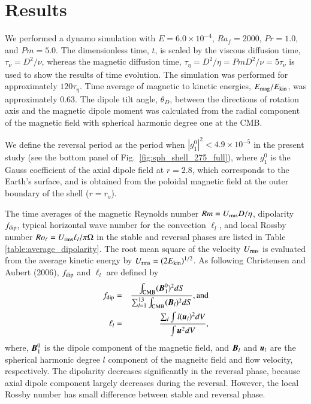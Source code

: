 \section{Results}
\label{section:results}

We performed a dynamo simulation with $E = 6.0 \times 10^{-4}$, $Ra_f = 2000$, $Pr = 1.0$, and $Pm = 5.0$. 
The dimensionless time, $t$, is scaled by the viscous diffusion time, $\tau_\nu = D^2 / \nu$, whereas the magnetic diffusion time, $\tau_\eta = D^2 / \eta = Pm D^2 / \nu = 5 \tau_\nu$ is used to show the results of time evolution.
The simulation was performed for approximately $120 \tau_\eta$. %
Time average of magnetic to kinetic energies, $E_{\rm mag} / E_{\rm kin}$, was approximately 0.63. 
The dipole tilt angle, $\theta_D$, between the directions of rotation axis and the magnetic dipole moment was calculated from the radial component of the magnetic field with spherical harmonic degree one  at the CMB.




We define the reversal period as the period when $\left| g_{1}^{0} \right|^2 < 4.9 \times 10^{-5}$ in the present study (see the bottom panel of Fig.~\ref{fig:sph_shell_275_full}), where $g_{1}^{0}$ is the Gauss coefficient of the axial dipole field at $r=2.8$, which corresponds to the Earth’s surface, and is obtained from the poloidal magnetic field at the outer boundary of the shell ($r=r_o$).
%

% 

%
The time averages of the magnetic Reynolds number $Rm = U_{\rm rms} D / \eta$, dipolarity $f_{\rm dip}$, typical horizontal wave number for the convection $\ell_{l}$, and local Rossby number $Ro_{\ell} = U_{\rm rms} \ell_{l} / \pi \Omega $ in the stable and reversal phases are listed in Table \ref{table:average_dipolarity}. The root mean square of the velocity $U_{\rm rms}$ is evaluated from the average kinetic energy by $U_{\rm rms} = (2 E_{\rm kin})^{1/2}$. 
As following Christensen and Aubert (2006), $f_{\rm dip} $ and $\ell_{l}$ are defined by
%
\begin{eqnarray}
f_{\rm dip} &=& \frac{\int_{\rm{CMB}} (\mbox{\boldmath$B$}_{1}^{0})^2 dS}{\sum_{l=1}^{13} \int_{\rm{CMB}} (\mbox{\boldmath$B$}_l)^2 dS}, \mbox{and} \\
\ell_{l} &=& \frac{\sum_{l} \int l(\mbox{\boldmath$u$}_{l})^2 dV}{\int \mbox{\boldmath$u$}^2 dV},
\end{eqnarray}
where, $\mbox{\boldmath$B$}_{1}^{0}$ is the 
dipole component of the magnetic field, and $\mbox{\boldmath$B$}_{l}$ and $\mbox{\boldmath$u$}_{l}$ are the spherical harmonic degree $l$ component of the magneitc field and flow velocity, respectively.
%
The dipolarity decreases significantly in the reversal phase, because axial dipole component largely decreases during the reversal. However, the local Rossby number has small difference between stable and reversal phase.

